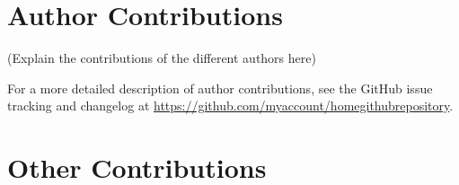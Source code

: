 \documentclass[9pt,tutorial]{livecoms}
\newcommand{\githubrepository}{\url{https://github.com/myaccount/homegithubrepository}}  %
\begin{document}
\begin{Checklists}[h]
%

\end{Checklists}








\section*{Author Contributions}
%

(Explain the contributions of the different authors here)

For a more detailed description of author contributions,
see the GitHub issue tracking and changelog at \githubrepository.

\section*{Other Contributions}
%
\end{document}
